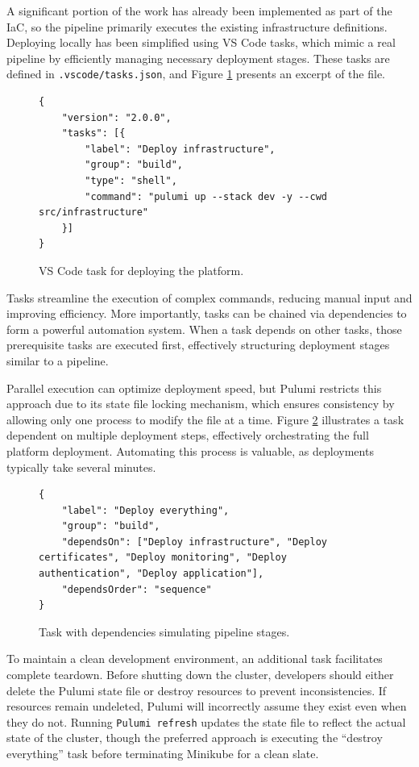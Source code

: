 A significant portion of the work has already been implemented as part of the IaC, so the pipeline primarily executes the existing infrastructure definitions. Deploying locally has been simplified using VS Code tasks, which mimic a real pipeline by efficiently managing necessary deployment stages. These tasks are defined in \texttt{.vscode/tasks.json}, and Figure \ref{fig:vscode_tasks} presents an excerpt of the file.

\begin{figure}[h]
\begin{verbatim}
{
    "version": "2.0.0",
    "tasks": [{
        "label": "Deploy infrastructure",
        "group": "build",
        "type": "shell",
        "command": "pulumi up --stack dev -y --cwd src/infrastructure"
    }]
}
\end{verbatim}
    \caption{VS Code task for deploying the platform.}
    \label{fig:vscode_tasks}
\end{figure}

Tasks streamline the execution of complex commands, reducing manual input and improving efficiency. More importantly, tasks can be chained via dependencies to form a powerful automation system. When a task depends on other tasks, those prerequisite tasks are executed first, effectively structuring deployment stages similar to a pipeline.

Parallel execution can optimize deployment speed, but Pulumi restricts this approach due to its state file locking mechanism, which ensures consistency by allowing only one process to modify the file at a time. Figure \ref{fig:vscode_tasks_deps} illustrates a task dependent on multiple deployment steps, effectively orchestrating the full platform deployment. Automating this process is valuable, as deployments typically take several minutes.

\begin{figure}[h]
\begin{verbatim}
{
    "label": "Deploy everything",
    "group": "build",
    "dependsOn": ["Deploy infrastructure", "Deploy certificates", "Deploy monitoring", "Deploy authentication", "Deploy application"],
    "dependsOrder": "sequence"
}
\end{verbatim}
\caption{Task with dependencies simulating pipeline stages.}
\label{fig:vscode_tasks_deps}
\end{figure}

To maintain a clean development environment, an additional task facilitates complete teardown. Before shutting down the cluster, developers should either delete the Pulumi state file or destroy resources to prevent inconsistencies. If resources remain undeleted, Pulumi will incorrectly assume they exist even when they do not. Running \texttt{Pulumi refresh} updates the state file to reflect the actual state of the cluster, though the preferred approach is executing the ``destroy everything'' task before terminating Minikube for a clean slate.

